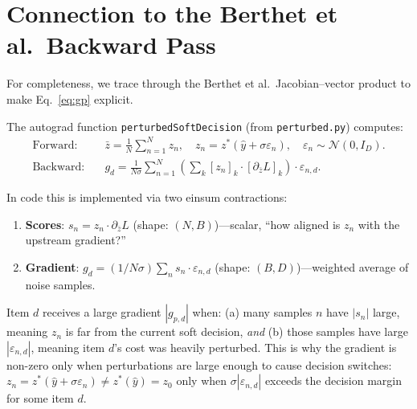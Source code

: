 \documentclass[11pt]{article}
\begin{document}
\appendix
\section{Connection to the Berthet et al.\ Backward Pass}
\label{app:berthet}

For completeness, we trace through the Berthet et al.\ Jacobian--vector product
to make Eq.~\eqref{eq:gp} explicit.

The autograd function \texttt{perturbedSoftDecision} (from \texttt{perturbed.py})
computes:
\begin{align}
  \text{Forward:} &\quad \bar{z} = \frac{1}{N}\sum_{n=1}^N z_n, \quad
    z_n = z^*(\hat{y} + \sigma\varepsilon_n), \quad
    \varepsilon_n \sim \mathcal{N}(0, I_D). \\[4pt]
  \text{Backward:} &\quad g_d = \frac{1}{N\sigma}\sum_{n=1}^N
    \left(\sum_k [z_n]_k \cdot [\partial_{\bar{z}} L]_k\right) \cdot \varepsilon_{n,d}.
\end{align}

In code this is implemented via two einsum contractions:
\begin{enumerate}[itemsep=2pt]
  \item \textbf{Scores}: $s_n = z_n \cdot \partial_{\bar{z}} L$ \quad
        (shape: $(N, B)$)---scalar, ``how aligned is $z_n$ with the upstream gradient?''
  \item \textbf{Gradient}: $g_d = (1/N\sigma)\sum_n s_n \cdot \varepsilon_{n,d}$
        \quad (shape: $(B, D)$)---weighted average of noise samples.
\end{enumerate}

Item $d$ receives a large gradient $|g_{p,d}|$ when: (a) many samples $n$ have
$|s_n|$ large, meaning $z_n$ is far from the current soft decision, \emph{and}
(b) those samples have large $|\varepsilon_{n,d}|$, meaning item $d$'s cost was
heavily perturbed.  This is why the gradient is non-zero only when perturbations
are large enough to cause decision switches: $z_n = z^*(\hat{y} + \sigma\varepsilon_n)
\neq z^*(\hat{y}) = z_0$ only when $\sigma|\varepsilon_{n,d}|$ exceeds the decision
margin for some item $d$.
\end{document}

